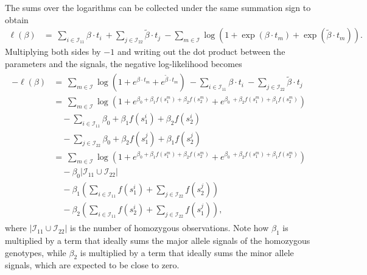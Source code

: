 \documentclass[preprint,5p,times,11pt]{elsarticle}
\begin{document}
The sums over the logarithms can be collected under the same summation sign to obtain
\begin{align*}
\ell\left(\beta\right)
&= \ \sum_{i\in\mathcal{I}_{11}} \beta \cdot t_i
\ + \sum_{j\in\mathcal{I}_{22}} \tilde{\beta} \cdot t_j
\ - \sum_{m \in \mathcal{I}} \log\left(1 + \exp\left(\beta \cdot t_m\right) + \exp\left(\tilde{\beta} \cdot t_m\right)\right).
\end{align*}
Multiplying both sides by $-1$ and writing out the dot product between the parameters and the signals, the negative log-likelihood becomes
\begin{align}\label{eq:loglikelihood}
\begin{split}
-\ell\left(\beta\right)
&= \ \sum_{m \in \mathcal{I}} \log\left(1 + e^{\beta \cdot t_m} + e^{\tilde{\beta} \cdot t_m}\right)
\ - \sum_{i\in\mathcal{I}_{11}} \beta \cdot t_i
\ - \sum_{j\in\mathcal{I}_{22}} \tilde{\beta} \cdot t_j \\
&= \ \sum_{m \in \mathcal{I}} \log\left(1 + e^{\beta_0 + \beta_1 f\left(s_1^m\right) + \beta_2 f\left(s_2^m\right)} + e^{\beta_0 \ + \beta_2 f\left(s_1^m\right) + \beta_1 f\left(s_2^m\right)}\right) \\
&\quad - \sum_{i\in\mathcal{I}_{11}} \beta_0 + \beta_1 f\left(s_1^i\right) + \beta_2 f\left(s_2^i\right) \\
&\quad - \sum_{j\in\mathcal{I}_{22}} \beta_0 + \beta_2 f\left(s_1^j\right) + \beta_1 f\left(s_2^j\right) \\
&= \ \sum_{m \in \mathcal{I}} \log\left(1 + e^{\beta_0 + \beta_1 f\left(s_1^m\right) + \beta_2 f\left(s_2^m\right)} + e^{\beta_0 \ + \beta_2 f\left(s_1^m\right) + \beta_1 f\left(s_2^m\right)}\right) \\
&\quad - \beta_0 \lvert\mathcal{I}_{11}\cup\mathcal{I}_{22}\rvert \\
&\quad - \beta_1 \left( \sum_{i\in\mathcal{I}_{11}} f\left(s_1^i\right) + \sum_{j\in\mathcal{I}_{22}} f\left(s_2^j\right) \right) \\
&\quad - \beta_2 \left( \sum_{i\in\mathcal{I}_{11}} f\left(s_2^i\right) + \sum_{j\in\mathcal{I}_{22}} f\left(s_1^j\right) \right),
\end{split}
\end{align}
where $\lvert\mathcal{I}_{11}\cup\mathcal{I}_{22}\rvert$ is the number of homozygous observations.
Note how $\beta_1$ is multiplied by a term that ideally sums the major allele signals of the homozygous genotypes, while $\beta_2$ is multiplied by a term that ideally sums the minor allele signals, which are expected to be close to zero.
\end{document}
